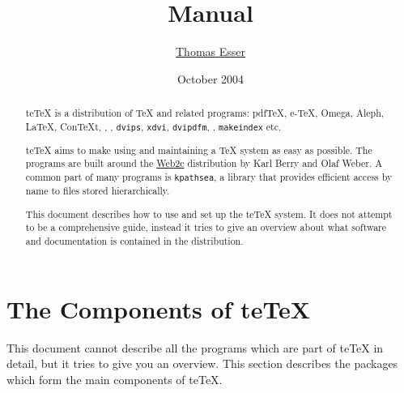 \documentclass[11pt,a4paper]{article}
\title{\teTeX{} Manual}
\author{\href{mailto:te@dbs.uni-hannover.de}{Thomas Esser}}
\date{October 2004}
\newcommand{\teTeX}{\textrm{te}\TeX\xspace}
\begin{document}
\maketitle

\begin{abstract}
  
  \teTeX{} is a distribution of \TeX{} and related programs: pdf\TeX,
  e-\TeX, Omega, Aleph, \LaTeX, Con\TeX{}t, \MF, \MP{}, \texttt{dvips},
  \texttt{xdvi}, \texttt{dvipdfm}, \BibTeX{}, \texttt{makeindex} etc.
  
  \teTeX{} aims to make using and maintaining a \TeX{} system as easy
  as possible. The programs are built around the
  \href{http://tug.org/web2c/}{Web2c} distribution by Karl Berry
  and Olaf Weber. A common part of many programs is \texttt{kpathsea},
  a library that provides efficient access by name to files stored
  hierarchically.
  
  This document describes how to use and set up the \teTeX{} system.
  It does not attempt to be a comprehensive guide, instead it tries to
  give an overview about what software and documentation is contained
  in the distribution.
\end{abstract}

\newpage
\tableofcontents

\newpage

\section{The Components of \teTeX}\label{sec:components}

This document cannot describe all the programs which are part of
\teTeX{} in detail, but it tries to give you an overview. This section
describes the packages which form the main components of \teTeX{}.
\end{document}

